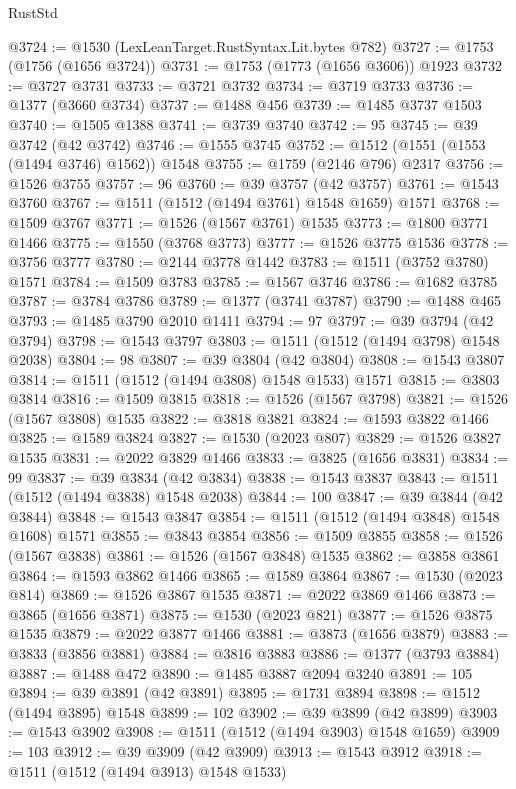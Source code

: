 \begin{lexlean}{RustStd}
\begin{coremodule}
{{@3724 := @1530 (LexLeanTarget.RustSyntax.Lit.bytes @782)
@3727 := @1753 (@1756 (@1656 @3724))
@3731 := @1753 (@1773 (@1656 @3606)) @1923
@3732 := @3727 @3731
@3733 := @3721 @3732
@3734 := @3719 @3733
@3736 := @1377 (@3660 @3734)
@3737 := @1488 @456
@3739 := @1485 @3737 @1503
@3740 := @1505 @1388
@3741 := @3739 @3740
@3742 := 95
@3745 := @39 @3742 (@42 @3742)
@3746 := @1555 @3745
@3752 := @1512 (@1551 (@1553 (@1494 @3746) @1562)) @1548
@3755 := @1759 (@2146 @796) @2317
@3756 := @1526 @3755
@3757 := 96
@3760 := @39 @3757 (@42 @3757)
@3761 := @1543 @3760
@3767 := @1511 (@1512 (@1494 @3761) @1548 @1659) @1571
@3768 := @1509 @3767
@3771 := @1526 (@1567 @3761) @1535
@3773 := @1800 @3771 @1466
@3775 := @1550 (@3768 @3773)
@3777 := @1526 @3775 @1536
@3778 := @3756 @3777
@3780 := @2144 @3778 @1442
@3783 := @1511 (@3752 @3780) @1571
@3784 := @1509 @3783
@3785 := @1567 @3746
@3786 := @1682 @3785
@3787 := @3784 @3786
@3789 := @1377 (@3741 @3787)
@3790 := @1488 @465
@3793 := @1485 @3790 @2010 @1411
@3794 := 97
@3797 := @39 @3794 (@42 @3794)
@3798 := @1543 @3797
@3803 := @1511 (@1512 (@1494 @3798) @1548 @2038)
@3804 := 98
@3807 := @39 @3804 (@42 @3804)
@3808 := @1543 @3807
@3814 := @1511 (@1512 (@1494 @3808) @1548 @1533) @1571
@3815 := @3803 @3814
@3816 := @1509 @3815
@3818 := @1526 (@1567 @3798)
@3821 := @1526 (@1567 @3808) @1535
@3822 := @3818 @3821
@3824 := @1593 @3822 @1466
@3825 := @1589 @3824
@3827 := @1530 (@2023 @807)
@3829 := @1526 @3827 @1535
@3831 := @2022 @3829 @1466
@3833 := @3825 (@1656 @3831)
@3834 := 99
@3837 := @39 @3834 (@42 @3834)
@3838 := @1543 @3837
@3843 := @1511 (@1512 (@1494 @3838) @1548 @2038)
@3844 := 100
@3847 := @39 @3844 (@42 @3844)
@3848 := @1543 @3847
@3854 := @1511 (@1512 (@1494 @3848) @1548 @1608) @1571
@3855 := @3843 @3854
@3856 := @1509 @3855
@3858 := @1526 (@1567 @3838)
@3861 := @1526 (@1567 @3848) @1535
@3862 := @3858 @3861
@3864 := @1593 @3862 @1466
@3865 := @1589 @3864
@3867 := @1530 (@2023 @814)
@3869 := @1526 @3867 @1535
@3871 := @2022 @3869 @1466
@3873 := @3865 (@1656 @3871)
@3875 := @1530 (@2023 @821)
@3877 := @1526 @3875 @1535
@3879 := @2022 @3877 @1466
@3881 := @3873 (@1656 @3879)
@3883 := @3833 (@3856 @3881)
@3884 := @3816 @3883
@3886 := @1377 (@3793 @3884)
@3887 := @1488 @472
@3890 := @1485 @3887 @2094 @3240
@3891 := 105
@3894 := @39 @3891 (@42 @3891)
@3895 := @1731 @3894
@3898 := @1512 (@1494 @3895) @1548
@3899 := 102
@3902 := @39 @3899 (@42 @3899)
@3903 := @1543 @3902
@3908 := @1511 (@1512 (@1494 @3903) @1548 @1659)
@3909 := 103
@3912 := @39 @3909 (@42 @3909)
@3913 := @1543 @3912
@3918 := @1511 (@1512 (@1494 @3913) @1548 @1533)
}}
\end{coremodule}
\end{lexlean}
